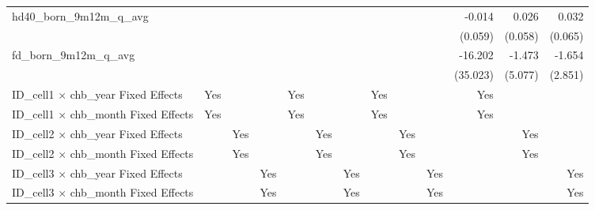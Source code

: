 \begin{tabular}{lrrrrrrrrrrrr}
hd40\_born\_9m12m\_q\_avg                   &              &              &              &              &              &              &              &              &              &       -0.014 &        0.026 &        0.032 \\ 
                                            &              &              &              &              &              &              &              &              &              &      (0.059) &      (0.058) &      (0.065) \\ 
fd\_born\_9m12m\_q\_avg                     &              &              &              &              &              &              &              &              &              &      -16.202 &       -1.473 &       -1.654 \\ 
                                            &              &              &              &              &              &              &              &              &              &     (35.023) &      (5.077) &      (2.851) \\ 
\midrule
ID\_cell1 $\times$ chb\_year Fixed Effects  &          Yes &              &              &          Yes &              &              &          Yes &              &              &          Yes &              &              \\ 
ID\_cell1 $\times$ chb\_month Fixed Effects &          Yes &              &              &          Yes &              &              &          Yes &              &              &          Yes &              &              \\ 
ID\_cell2 $\times$ chb\_year Fixed Effects  &              &          Yes &              &              &          Yes &              &              &          Yes &              &              &          Yes &              \\ 
ID\_cell2 $\times$ chb\_month Fixed Effects &              &          Yes &              &              &          Yes &              &              &          Yes &              &              &          Yes &              \\ 
ID\_cell3 $\times$ chb\_year Fixed Effects  &              &              &          Yes &              &              &          Yes &              &              &          Yes &              &              &          Yes \\ 
ID\_cell3 $\times$ chb\_month Fixed Effects &              &              &          Yes &              &              &          Yes &              &              &          Yes &              &              &          Yes \\ 

\end{tabular}
